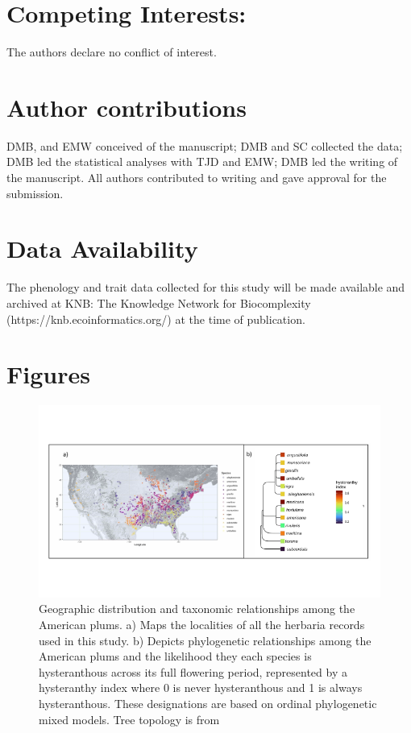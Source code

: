 \documentclass{article}[12pt]
\begin{document}
\section*{Competing Interests:}
The authors declare no conflict of interest.

\section*{Author contributions}
DMB, and EMW conceived of the manuscript; DMB and SC collected the data; DMB led the statistical analyses with TJD and EMW; DMB led the writing of the manuscript. All authors contributed to writing and gave approval for the submission.

\section*{Data Availability}
The phenology and trait data collected for this study will be made available and archived at KNB: The Knowledge Network for Biocomplexity (https://knb.ecoinformatics.org/) at the time of publication.


 

\newpage
\section*{Figures}


\begin{figure}[h!]
  \centering
 \includegraphics[width=\textwidth]{..//..//Plots/fig1_new.png}
    \caption{Geographic distribution and taxonomic relationships among the American plums. a) Maps the localities of all the herbaria records used in this study. b) Depicts phylogenetic relationships among the American plums and the likelihood they each species is hysteranthous across its full flowering period, represented by a hysteranthy index where 0 is never hysteranthous and 1 is always hysteranthous. These designations are based on ordinal phylogenetic mixed models. Tree topology is from \citet{Shaw:2004aa}}
    \label{fig:phylo2}
\end{figure}
\end{document}
